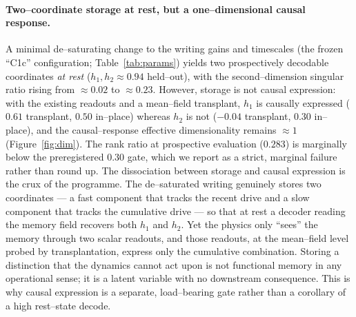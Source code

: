\documentclass[11pt]{article}
\begin{document}
\paragraph{Two--coordinate storage at rest, but a one--dimensional causal response.} A minimal de--saturating change
to the writing gains and timescales (the frozen ``C1c'' configuration; Table~\ref{tab:params}) yields two
prospectively decodable coordinates \emph{at rest} ($h_1,h_2\approx0.94$ held--out), with the second--dimension
singular ratio rising from $\approx0.02$ to $\approx0.23$. However, storage is not causal expression: with the
existing readouts and a mean--field transplant, $h_1$ is causally expressed ($0.61$ transplant, $0.50$ in--place)
whereas $h_2$ is not ($-0.04$ transplant, $0.30$ in--place), and the causal--response effective dimensionality
remains $\approx1$ (Figure~\ref{fig:dim}). The rank ratio at prospective evaluation ($0.283$) is marginally below the
preregistered $0.30$ gate, which we report as a strict, marginal failure rather than round up. The dissociation between storage and causal expression is the crux of the programme. The de--saturated writing genuinely stores two coordinates --- a fast component that tracks the recent drive and a slow component that tracks the cumulative drive --- so that at rest a decoder reading the memory field recovers both $h_1$ and $h_2$. Yet the physics only ``sees'' the memory through two scalar readouts, and those readouts, at the mean--field level probed by transplantation, express only the cumulative combination. Storing a distinction that the dynamics cannot act upon is not functional memory in any operational sense; it is a latent variable with no downstream consequence. This is why causal expression is a separate, load--bearing gate rather than a corollary of a high rest--state decode.
\end{document}
